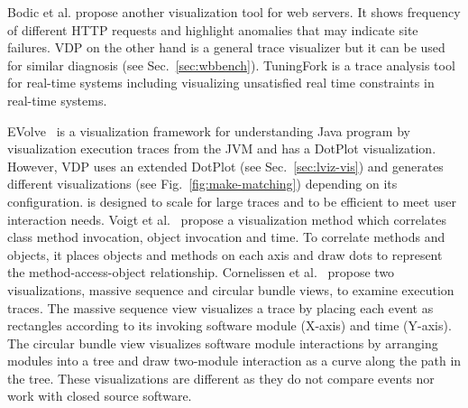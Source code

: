 Bodic et al. \cite{bodik2005combining} propose another visualization tool for
web servers.
It shows frequency of different HTTP requests
and highlight anomalies that may indicate site failures.
VDP on the other hand is a general trace visualizer but
it can be used for similar diagnosis (see Sec.~\ref{sec:wbbench}).
TuningFork \cite{bacon2007tuningfork} is a trace analysis tool for real-time systems
including visualizing unsatisfied real time constraints in
real-time systems.

EVolve~\cite{wang2003evolve} is a visualization framework for understanding
Java program by visualization execution traces from the JVM and
has a DotPlot visualization.
However, VDP uses an extended DotPlot (see Sec.~\ref{sec:lviz-vis})
and generates different visualizations (see Fig.~\ref{fig:make-matching})
depending on its configuration.
 is designed to scale for large traces and
to be efficient to meet user interaction needs.
Voigt et al.~\cite{voigt2009object} propose a visualization method which correlates
class method invocation, object invocation and time.
To correlate methods and objects, it places objects and methods
on each axis and draw dots to represent the
method-access-object relationship.
Cornelissen et al.~\cite{cornelissen2007understanding} propose two visualizations,
massive sequence and circular bundle views, to examine execution traces.
The massive sequence view visualizes a trace by placing each event as rectangles
according to its invoking software module (X-axis) and time (Y-axis).
The circular bundle view visualizes software module interactions by arranging
modules into a tree and draw two-module interaction as a curve along the
path in the tree.
These visualizations are different as they do not compare events 
nor work with closed source software.

